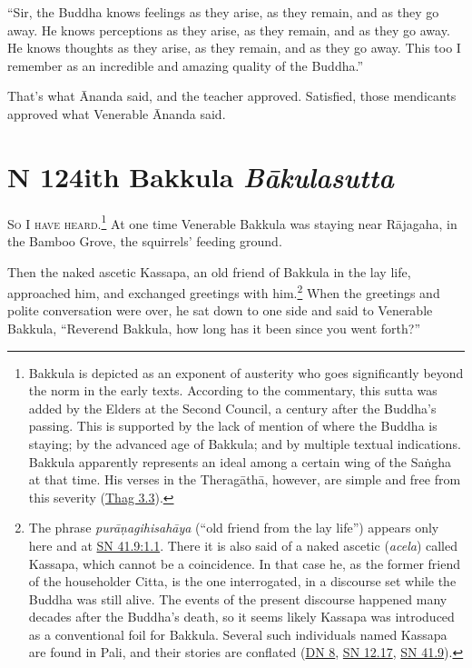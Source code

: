 \documentclass[12pt,openany]{book}%
\newcommand*{\suttatitleacronym}[1]{\smaller[2]{#1}\vspace*{.3em}}
\newcommand*{\suttatitletranslation}[1]{\linebreak{#1}}
\newcommand*{\suttatitleroot}[1]{\linebreak\smaller[2]\itshape{#1}}
\newcommand*{\tocacronym}[1]{\hspace*{-3.3em}{#1}\quad}
\newcommand*{\toctranslation}[1]{#1}
\newcommand*{\tocroot}[1]{(\textit{#1})}
\newcommand*{\scevam}[1]{\textsc{#1}}
\begin{document}
“Sir, the Buddha knows feelings as they arise, as they remain, and as they go away. He knows perceptions as they arise, as they remain, and as they go away. He knows thoughts as they arise, as they remain, and as they go away. This too I remember as an incredible and amazing quality of the Buddha.” 

That’s what Ānanda said, and the teacher approved. Satisfied, those mendicants approved what Venerable Ānanda said. 

%
\section*{{\suttatitleacronym MN 124}{\suttatitletranslation With Bakkula }{\suttatitleroot Bākulasutta}}
\addcontentsline{toc}{section}{\tocacronym{MN 124} \toctranslation{With Bakkula } \tocroot{Bākulasutta}}

\scevam{So I have heard.\footnote{Bakkula is depicted as an exponent of austerity who goes significantly beyond the norm in the early texts. According to the commentary, this sutta was added by the Elders at the Second Council, a century after the Buddha’s passing. This is supported by the lack of mention of where the Buddha is staying; by the advanced age of Bakkula; and by multiple textual indications. Bakkula apparently represents an ideal among a certain wing of the \textsanskrit{Saṅgha} at that time. His verses in the \textsanskrit{Theragāthā}, however, are simple and free from this severity (\href{https://suttacentral.net/thag3.3/en/sujato}{Thag 3.3}). } }At one time Venerable Bakkula was staying near \textsanskrit{Rājagaha}, in the Bamboo Grove, the squirrels’ feeding ground. 

Then the naked ascetic Kassapa, an old friend of Bakkula in the lay life, approached him, and exchanged greetings with him.\footnote{The phrase \textit{\textsanskrit{purāṇagihisahāya}} (“old friend from the lay life”) appears only here and at \href{https://suttacentral.net/sn41.9/en/sujato\#1.1}{SN 41.9:1.1}. There it is also said of a naked ascetic (\textit{acela}) called Kassapa, which cannot be a coincidence. In that case he, as the former friend of the householder Citta, is the one interrogated, in a discourse set while the Buddha was still alive. The events of the present discourse happened many decades after the Buddha’s death, so it seems likely Kassapa was introduced as a conventional foil for Bakkula. Several such individuals named Kassapa are found in Pali, and their stories are conflated (\href{https://suttacentral.net/dn8/en/sujato}{DN 8}, \href{https://suttacentral.net/sn12.17/en/sujato}{SN 12.17}, \href{https://suttacentral.net/sn41.9/en/sujato}{SN 41.9}). } When the greetings and polite conversation were over, he sat down to one side and said to Venerable Bakkula, “Reverend Bakkula, how long has it been since you went forth?” 
\end{document}
